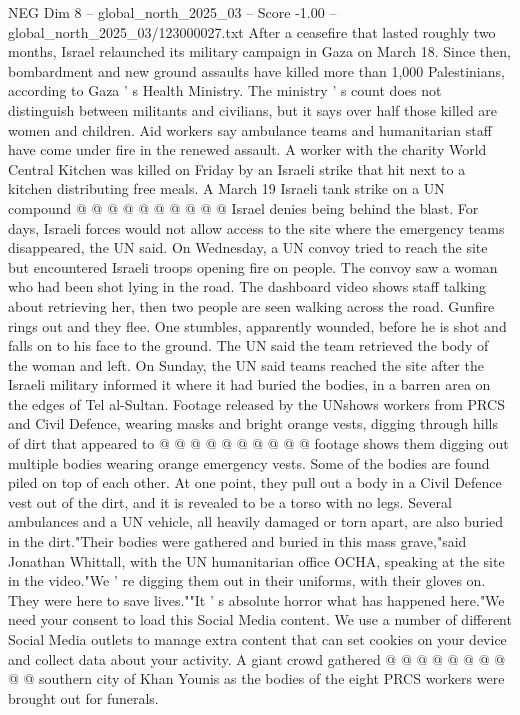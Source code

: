 \begin{textsample}{NEG Dim 8 – global\_north\_2025\_03 – Score -1.00 – global\_north\_2025\_03/123000027.txt}
After a ceasefire that lasted roughly two months, Israel relaunched its military campaign in Gaza on March 18.
Since then, bombardment and new ground assaults have killed more than 1,000 Palestinians, according to Gaza ' s Health Ministry.
The ministry ' s count does not distinguish between militants and civilians, but it says over half those killed are women and children.
Aid workers say ambulance teams and humanitarian staff have come under fire in the renewed assault.
A worker with the charity World Central Kitchen was killed on Friday by an Israeli strike that hit next to a kitchen distributing free meals.
A March 19 Israeli tank strike on a UN compound @ @ @ @ @ @ @ @ @ @ Israel denies being behind the blast.
For days, Israeli forces would not allow access to the site where the emergency teams disappeared, the UN said.
On Wednesday, a UN convoy tried to reach the site but encountered Israeli troops opening fire on people.
The convoy saw a woman who had been shot lying in the road.
The dashboard video shows staff talking about retrieving her, then two people are seen walking across the road.
Gunfire rings out and they flee.
One stumbles, apparently wounded, before he is shot and falls on to his face to the ground.
The UN said the team retrieved the body of the woman and left.
On Sunday, the UN said teams reached the site after the Israeli military informed it where it had buried the bodies, in a barren area on the edges of Tel al-Sultan.
Footage released by the UNshows workers from PRCS and Civil Defence, wearing masks and bright orange vests, digging through hills of dirt that appeared to @ @ @ @ @ @ @ @ @ @ footage shows them digging out multiple bodies wearing orange emergency vests.
Some of the bodies are found piled on top of each other.
At one point, they pull out a body in a Civil Defence vest out of the dirt, and it is revealed to be a torso with no legs.
Several ambulances and a UN vehicle, all heavily damaged or torn apart, are also buried in the dirt."Their bodies were gathered and buried in this mass grave,"said Jonathan Whittall, with the UN humanitarian office OCHA, speaking at the site in the video."We ' re digging them out in their uniforms, with their gloves on.
They were here to save lives.""It ' s absolute horror what has happened here."We need your consent to load this Social Media content.
We use a number of different Social Media outlets to manage extra content that can set cookies on your device and collect data about your activity.
A giant crowd gathered @ @ @ @ @ @ @ @ @ @ southern city of Khan Younis as the bodies of the eight PRCS workers were brought out for funerals.

\end{textsample}
